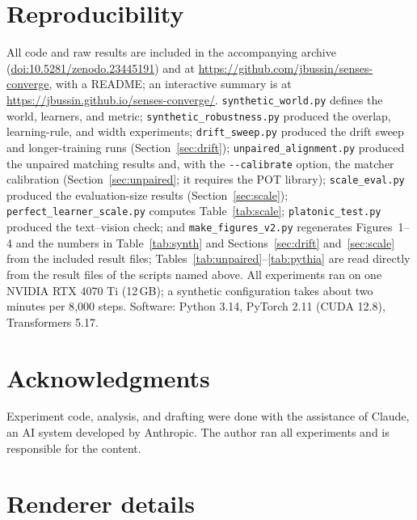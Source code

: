 \documentclass[11pt]{article}
\begin{document}
\section*{Reproducibility}
{\sloppy All code and raw results are included in the accompanying archive (\href{https://doi.org/10.5281/zenodo.23445191}{doi:10.5281/zenodo.23445191}) and at \url{https://github.com/jbussin/senses-converge}, with a README; an interactive summary is at \url{https://jbussin.github.io/senses-converge/}. \texttt{synthetic\_world.py} defines the world, learners, and metric; \texttt{synthetic\_robustness.py} produced the overlap, learning-rule, and width experiments; \texttt{drift\_sweep.py} produced the drift sweep and longer-training runs (Section~\ref{sec:drift}); \texttt{unpaired\_alignment.py} produced the unpaired matching results and, with the \texttt{-{}-calibrate} option, the matcher calibration (Section~\ref{sec:unpaired}; it requires the POT library); \texttt{scale\_eval.py} produced the evaluation-size results (Section~\ref{sec:scale}); \texttt{perfect\_learner\_scale.py} computes Table~\ref{tab:scale}; \texttt{platonic\_test.py} produced the text--vision check; and \texttt{make\_figures\_v2.py} regenerates Figures~1--4 and the numbers in Table~\ref{tab:synth} and Sections~\ref{sec:drift} and~\ref{sec:scale} from the included result files; Tables~\ref{tab:unpaired}--\ref{tab:pythia} are read directly from the result files of the scripts named above. All experiments ran on one NVIDIA RTX 4070 Ti (12\,GB); a synthetic configuration takes about two minutes per 8{,}000 steps. Software: Python 3.14, PyTorch 2.11 (CUDA 12.8), Transformers 5.17.\par}

\section*{Acknowledgments}
Experiment code, analysis, and drafting were done with the assistance of Claude, an AI system developed by Anthropic. The author ran all experiments and is responsible for the content.




\appendix
\section{Renderer details}
\label{app:render}
\end{document}
